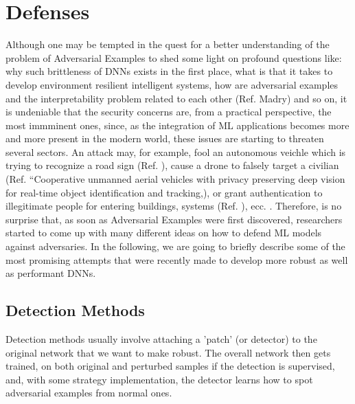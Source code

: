 \documentclass[LaM,binding=0.6cm]{./packages/sapthesis/sapthesis}
\begin{document}
        
    \section{Defenses}
        
    Although one may be tempted in the quest for a better understanding of the problem of 
    Adversarial Examples to shed some light on profound questions like: 
    why such brittleness of DNNs exists in the first place, what is that it takes to develop environment 
    resilient intelligent systems, how are adversarial examples and the interpretability problem related to each other (Ref. Madry)
    and so on, it is undeniable that the security concerns are, from a practical perspective, the most immminent 
    ones, since, as the integration of ML applications becomes more and more present in 
    the modern world, these issues are starting to threaten several sectors. 
    An attack may, for example, fool an autonomous veichle which is trying to recognize a road sign (Ref. ), 
    cause a drone to falsely target a civilian (Ref. “Cooperative unmanned aerial vehicles with privacy preserving
    deep vision for real-time object identification and tracking,), or grant authentication to illegitimate people for
    entering buildings, systems (Ref. ), ecc. . Therefore, is no surprise that, as soon as
    Adversarial Examples were first discovered, researchers started to come up with many different
    ideas on how to defend ML models against adversaries. In the following, we
    are going to briefly describe some of the most promising attempts that were recently made to develop 
    more robust as well as performant DNNs. 

    \subsection{Detection Methods}

            Detection methods usually involve attaching a 'patch' (or detector) to the original network that we
            want to make robust. The overall network then gets trained, on both original and perturbed samples if the detection
            is supervised, and, with some strategy implementation, the detector learns how to spot adversarial examples 
            from normal ones. 
\end{document}
